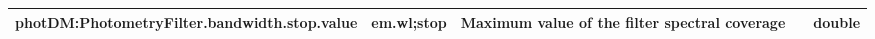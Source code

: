 \documentclass[11pt,a4paper]{ivoa}
\begin{document}
\begin{table}[H]
\begin{adjustbox}{angle=90}
\begin{tabular}{p{5in}p{0.87in}p{2in}p{0.4in}p{0.25in}}
\hline
\multicolumn{1}{p{5in}}{{\fontsize{8pt}{8pt}\selectfont photDM:PhotometryFilter.bandwidth.stop.value}} & 
\multicolumn{1}{p{0.87in}}{{\fontsize{8pt}{8pt}\selectfont em.wl;stop}} & 
\multicolumn{1}{p{2in}}{{\fontsize{8pt}{8pt}\selectfont Maximum value of the filter spectral coverage}} & 
\multicolumn{1}{p{0.74in}}{} & 
\multicolumn{1}{p{0.35in}}{{\fontsize{8pt}{8pt}\selectfont double}} \\
\hline
\end{tabular}
\end{adjustbox}
 \end{table}





\newpage


\end{document}
